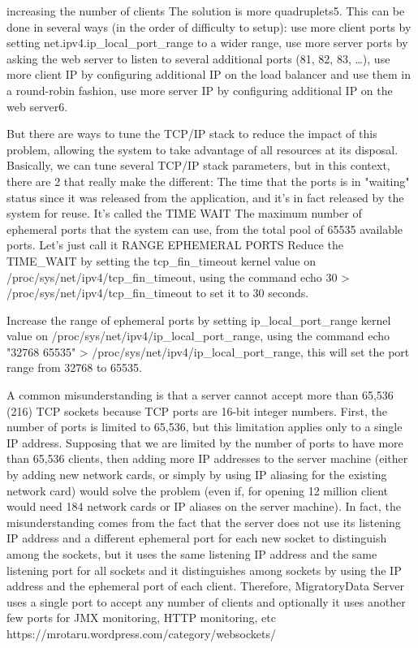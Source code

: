 \documentclass{uvamscse}
\begin{document}
increasing the number of clients
The solution is more quadruplets5. This can be done in several ways (in the order of difficulty to setup):
use more client ports by setting net.ipv4.ip\_local\_port\_range to a wider range,
use more server ports by asking the web server to listen to several additional ports (81, 82, 83, …),
use more client IP by configuring additional IP on the load balancer and use them in a round-robin fashion,
use more server IP by configuring additional IP on the web server6.

But there are ways to tune the TCP/IP stack to reduce the impact of this problem, allowing the system to take advantage of all resources at its disposal. Basically, we can tune several TCP/IP stack parameters, but in this context, there are 2 that really make the different:
The time that the ports is in "waiting" status since it was released from the application, and it's in fact released by the system for reuse. It's called the TIME WAIT
The maximum number of ephemeral ports that the system can use, from the total pool of 65535 available ports. Let's just call it RANGE EPHEMERAL PORTS
Reduce the TIME\_WAIT by setting the tcp\_fin\_timeout kernel value on /proc/sys/net/ipv4/tcp\_fin\_timeout, using the command echo 30 > /proc/sys/net/ipv4/tcp\_fin\_timeout to set it to 30 seconds.

Increase the range of ephemeral ports by setting ip\_local\_port\_range kernel value on /proc/sys/net/ipv4/ip\_local\_port\_range, using the command echo "32768 65535" > /proc/sys/net/ipv4/ip\_local\_port\_range, this will set the port range from 32768 to 65535.

A common misunderstanding is that a server cannot accept more than 65,536 (216) TCP sockets because TCP ports are 16-bit integer numbers.
First, the number of ports is limited to 65,536, but this limitation applies only to a single IP address. Supposing that we are limited by the number of ports to have more than 65,536 clients, then adding more IP addresses to the server machine (either by adding new network cards, or simply by using IP aliasing for the existing network card) would solve the problem (even if, for opening 12 million client would need 184 network cards or IP aliases on the server machine).
In fact, the misunderstanding comes from the fact that the server does not use its listening IP address and a different ephemeral port for each new socket to distinguish among the sockets, but it uses the same listening IP address and the same listening port for all sockets and it distinguishes among sockets by using the IP address and the ephemeral port of each client. Therefore, MigratoryData Server uses a single port to accept any number of clients and optionally it uses another few ports for JMX monitoring, HTTP monitoring, etc
https://mrotaru.wordpress.com/category/websockets/
\end{document}
